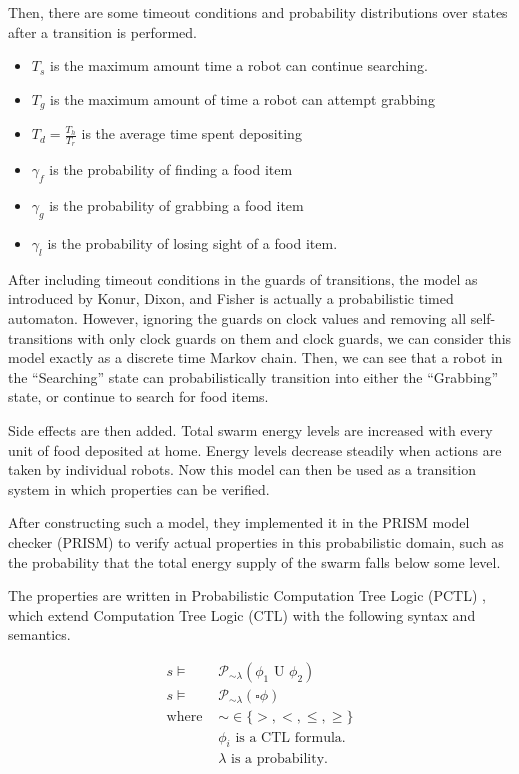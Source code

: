 \documentclass[11pt]{article}
\theoremstyle{definition}
\begin{document}
Then, there are some timeout conditions and probability
distributions over states after a transition is performed.

\begin{itemize}
    \item $ T_s $ is the maximum amount time a robot can continue searching.
    \item $ T_g $ is the maximum amount of time a robot can attempt
        grabbing
    \item $ T_d = \frac{T_h}{T_r} $ is the average time spent depositing
    \item $ \gamma_f $ is the probability of finding a food item
    \item $ \gamma_g $ is the probability of grabbing a food item
    \item $ \gamma_l $ is the probability of losing sight of a food
        item.
\end{itemize}

After including timeout conditions in the guards
of transitions, the model as introduced by Konur, Dixon, and
Fisher is actually a probabilistic timed automaton. However,
ignoring the guards on clock values and removing all self-transitions
with only clock guards on them and clock guards, we can consider this model
exactly as a discrete time Markov chain. Then, we can see
that a robot in the ``Searching'' state can probabilistically
transition into either the ``Grabbing'' state, or continue to
search for food items.

Side effects are then added. Total swarm energy levels are increased
with every unit of food deposited at home. Energy levels decrease
steadily when actions are taken by individual
robots. Now this model can then be used as a transition system in
which properties can be verified.

After constructing such a model, they implemented it in the PRISM model checker
(PRISM) to verify actual properties in this probabilistic domain, such
as the probability that the total energy supply of the swarm
falls below some level.

The properties are written in Probabilistic Computation Tree
Logic (PCTL) \cite{pctl}, which extend Computation Tree Logic (CTL)
with the following syntax and semantics.

\begin{align*}
    s \vDash & \mathcal{P}_{\sim\lambda}(\phi_1 \text{ U } \phi_2) \\
    s \vDash & \mathcal{P}_{\sim\lambda}(\square \phi) \\
    \text{where } & \sim \in \{ >, <, \leq, \geq \} \\
                  & \phi_i \text{ is a CTL formula.} \\
                  & \lambda \text{ is a probability.} \\
\end{align*}
\end{document}

